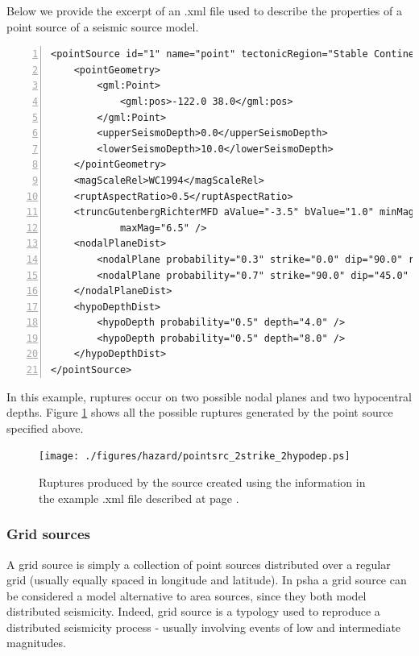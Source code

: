 Below we provide the excerpt of an .xml file used to describe the 
properties of a point source of a seismic source model.
\label{page:xml_point}
\begin{Verbatim}[frame=single, commandchars=\\\{\}, fontsize=\footnotesize,
    numbers=left, numbersep=2pt]
<pointSource id="1" name="point" tectonicRegion="Stable Continental Crust">
    <pointGeometry>
        <gml:Point>
            <gml:pos>-122.0 38.0</gml:pos>
        </gml:Point>
        <upperSeismoDepth>0.0</upperSeismoDepth>
        <lowerSeismoDepth>10.0</lowerSeismoDepth>
    </pointGeometry>
    <magScaleRel>WC1994</magScaleRel>
    <ruptAspectRatio>0.5</ruptAspectRatio>
    <truncGutenbergRichterMFD aValue="-3.5" bValue="1.0" minMag="5.0" 
			maxMag="6.5" />
    <nodalPlaneDist>
        <nodalPlane probability="0.3" strike="0.0" dip="90.0" rake="0.0" />
        <nodalPlane probability="0.7" strike="90.0" dip="45.0" rake="90.0" />
    </nodalPlaneDist>
    <hypoDepthDist>
        <hypoDepth probability="0.5" depth="4.0" />
        <hypoDepth probability="0.5" depth="8.0" />
    </hypoDepthDist>
</pointSource>
\end{Verbatim}
In this example, ruptures occur on two possible nodal planes and two 
hypocentral depths. Figure \ref{fig:point_source_ruptures} shows all 
the possible ruptures generated by the point source specified above.

\begin{figure}[!ht]
\centering
\texttt{[image: ./figures/hazard/pointsrc\_2strike\_2hypodep.ps]}
\caption{Ruptures produced by the source created using the information 
    in the example .xml file described at page \pageref{page:xml_point}.}
\label{fig:point_source_ruptures}
\end{figure}
%
\subsubsection{Grid sources}
\label{hazard:seismic_source_types:gridSources}
% 
A grid source is simply a collection of
point sources distributed over a regular grid (usually equally spaced in 
longitude and latitude).
%
In \gls{psha} a grid source can be considered a model alternative to area 
sources, since they both model distributed seismicity. 
%
Indeed, grid source is a typology used to reproduce a distributed 
seismicity process - usually involving events of low and intermediate 
magnitudes. 

